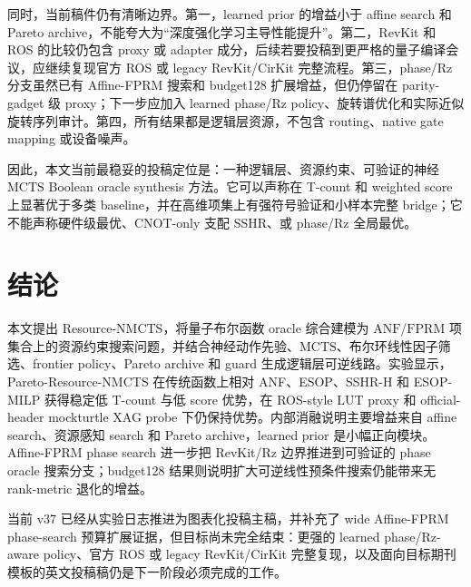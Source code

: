 \documentclass[UTF8,fontset=macnew,11pt]{ctexart}
\newcommand{\method}{Resource-NMCTS}
\newcommand{\anf}{\ensuremath{\mathrm{ANF}}}
\newcommand{\fprm}{\ensuremath{\mathrm{FPRM}}}
\newcommand{\mcts}{\ensuremath{\mathrm{MCTS}}}
\begin{document}
同时，当前稿件仍有清晰边界。第一，learned prior 的增益小于 affine search 和 Pareto archive，不能夸大为“深度强化学习主导性能提升”。第二，RevKit 和 ROS 的比较仍包含 proxy 或 adapter 成分，后续若要投稿到更严格的量子编译会议，应继续复现官方 ROS 或 legacy RevKit/CirKit 完整流程。第三，phase/Rz 分支虽然已有 Affine-FPRM 搜索和 budget128 扩展增益，但仍停留在 parity-gadget 级 proxy；下一步应加入 learned phase/Rz policy、旋转谱优化和实际近似旋转序列审计。第四，所有结果都是逻辑层资源，不包含 routing、native gate mapping 或设备噪声。

因此，本文当前最稳妥的投稿定位是：一种逻辑层、资源约束、可验证的神经 \mcts{} Boolean oracle synthesis 方法。它可以声称在 T-count 和 weighted score 上显著优于多类 baseline，并在高维项集上有强符号验证和小样本完整 bridge；它不能声称硬件级最优、CNOT-only 支配 SSHR、或 phase/Rz 全局最优。

\section{结论}

本文提出 \method{}，将量子布尔函数 oracle 综合建模为 \anf{}/\fprm{} 项集合上的资源约束搜索问题，并结合神经动作先验、\mcts{}、布尔环线性因子筛选、frontier policy、Pareto archive 和 guard 生成逻辑层可逆线路。实验显示，Pareto-\method{} 在传统函数上相对 ANF、ESOP、SSHR-H 和 ESOP-MILP 获得稳定低 T-count 与低 score 优势，在 ROS-style LUT proxy 和 official-header mockturtle XAG probe 下仍保持优势。内部消融说明主要增益来自 affine search、资源感知 search 和 Pareto archive，learned prior 是小幅正向模块。Affine-FPRM phase search 进一步把 RevKit/Rz 边界推进到可验证的 phase oracle 搜索分支；budget128 结果则说明扩大可逆线性预条件搜索仍能带来无 rank-metric 退化的增益。

当前 v37 已经从实验日志推进为图表化投稿主稿，并补充了 wide Affine-FPRM phase-search 预算扩展证据，但目标尚未完全结束：更强的 learned phase/Rz-aware policy、官方 ROS 或 legacy RevKit/CirKit 完整复现，以及面向目标期刊模板的英文投稿稿仍是下一阶段必须完成的工作。
\end{document}

